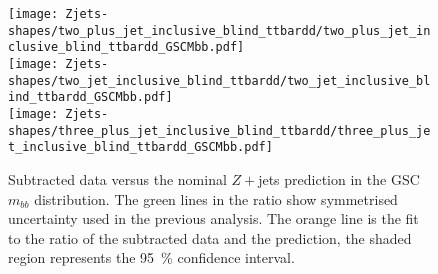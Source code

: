 \begin{figure}[ht]
  \centering
  \texttt{[image: Zjets-shapes/two\_plus\_jet\_inclusive\_blind\_ttbardd/two\_plus\_jet\_inclusive\_blind\_ttbardd\_GSCMbb.pdf]}
  \\
  \vspace{-8mm}
  \texttt{[image: Zjets-shapes/two\_jet\_inclusive\_blind\_ttbardd/two\_jet\_inclusive\_blind\_ttbardd\_GSCMbb.pdf]}
  \\
  \vspace{-8mm}
  \texttt{[image: Zjets-shapes/three\_plus\_jet\_inclusive\_blind\_ttbardd/three\_plus\_jet\_inclusive\_blind\_ttbardd\_GSCMbb.pdf]}
  \caption[Subtracted data versus the nominal $Z+$jets prediction, GSC
$m_{bb}$.]{\footnotesize Subtracted data versus the nominal $Z+$jets prediction
in the GSC $m_{bb}$ distribution. The green lines in the ratio show symmetrised
uncertainty used in the previous analysis. The orange line is the fit to the
ratio of the subtracted data and the prediction, the shaded region represents
the 95~\% confidence interval.}
  \label{fig:zjets-mbb-shapes}
\end{figure}